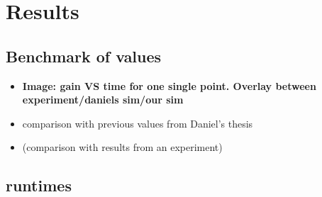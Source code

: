 \section{Results}

\subsection{Benchmark of values}

\begin{itemize}

  \item \textbf{Image: gain VS time for one single point. Overlay between
    experiment/daniels sim/our sim}

  \item comparison with previous values from Daniel's thesis

  \item (comparison with results from an experiment)

\end{itemize}



\subsection{runtimes}

